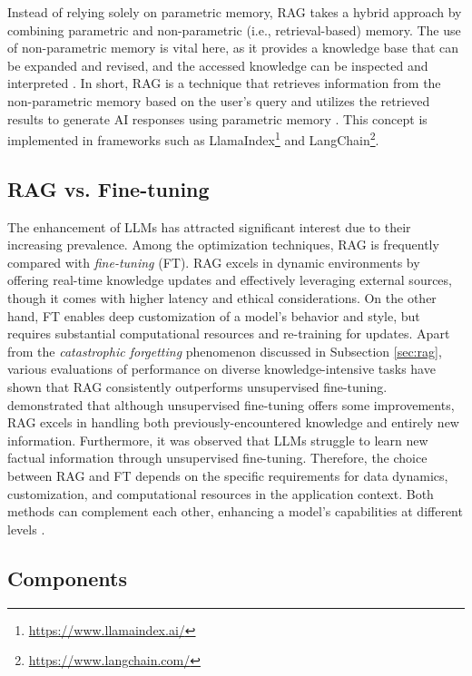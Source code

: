 Instead of relying solely on parametric memory, RAG takes a hybrid approach by combining parametric and non-parametric (i.e., retrieval-based) memory. The use of non-parametric memory is vital here, as it provides a knowledge base that can be expanded and revised, and the accessed knowledge can be inspected and interpreted \citep{lewis2021retrievalaugmentedgenerationknowledgeintensivenlp}. In short, RAG is a technique that retrieves information from the non-parametric memory based on the user's query and utilizes the retrieved results to generate AI responses using parametric memory \citep{larson2024graphrag}. This concept is implemented in frameworks such as LlamaIndex\footnote{\url{https://www.llamaindex.ai/}} and LangChain\footnote{\url{https://www.langchain.com/}}.


\subsection{RAG vs. Fine-tuning}
The enhancement of LLMs has attracted significant interest due to their increasing prevalence. Among the optimization techniques, RAG is frequently compared with \textit{fine-tuning} (FT). RAG excels in dynamic environments by offering real-time knowledge updates and effectively leveraging external sources, though it comes with higher latency and ethical considerations. On the other hand, FT enables deep customization of a model’s behavior and style, but requires substantial computational resources and re-training for updates. Apart from the \textit{catastrophic forgetting} phenomenon discussed in Subsection \ref{sec:rag}, various evaluations of performance on diverse knowledge-intensive tasks have shown that RAG consistently outperforms unsupervised fine-tuning. \cite{ovadia2024finetuningretrievalcomparingknowledge} demonstrated that although unsupervised fine-tuning offers some improvements, RAG excels in handling both previously-encountered knowledge and entirely new information. Furthermore, it was observed that LLMs struggle to learn new factual information through unsupervised fine-tuning. Therefore, the choice between RAG and FT depends on the specific requirements for data dynamics, customization, and computational resources in the application context. Both methods can complement each other, enhancing a model’s capabilities at different levels \citep{gao2024retrievalaugmentedgenerationlargelanguage}.

\subsection{Components}

